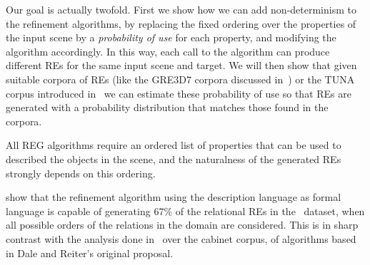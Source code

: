 Our goal is actually twofold. First we show how we can add non-determinism to the refinement algorithms, by replacing the fixed ordering 
over the properties of the input scene by a \emph{probability of use} for each property, and modifying the algorithm accordingly.  
In this way, each call to the algorithm can produce different REs for the same input scene and target.  We will then show that given suitable corpora of REs (like the GRE3D7 corpora discussed in~\cite{viet:gene11}) or the TUNA corpus introduced in~\cite{gatt-balz-kow:2008:ENLG} we can estimate these probability of use so that REs are generated with a probability distribution that matches those found in the corpora.  

All REG algorithms require an 
ordered list of properties that can be used to described the objects in the scene, and the naturalness of the generated REs strongly depends on this ordering. 

\cite{arec2:2008:Areces}
show that the refinement algorithm using the description language \el as formal language is capable of generating 67\% of 
the relational REs in the~\cite{viethen06:_algor_for_gener_refer_expres} dataset, when all possible orders of the relations in the domain are considered. This is in sharp contrast with the analysis 
done in~\cite{viethen06:_algor_for_gener_refer_expres} over the cabinet corpus, of algorithms based in Dale and Reiter's original proposal.    

